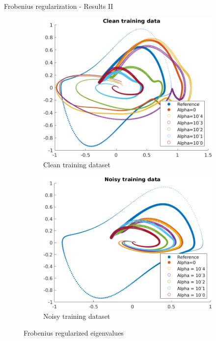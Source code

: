 \documentclass{beamer}
\begin{document}
\begin{frame}{Frobenius regularization - Results II}
    \begin{figure}
        \centering
        \begin{subfigure}[b]{0.45\textwidth}
            \centering
            \includegraphics[width=\textwidth]{Clean_Training.png}
            \caption{Clean training dataset}
            \label{fig:Eigen_clean}
        \end{subfigure}
        \hfill
        \begin{subfigure}[b]{0.45\textwidth}
            \centering
            \includegraphics[width=\textwidth]{Noisy_Training.png}
            \caption{Noisy training dataset}
            \label{fig:Eigen_noisy}
        \end{subfigure}
        \caption{Frobenius regularized eigenvalues}
        \label{fig:Eigen_Frobenius}
    \end{figure}
\end{frame}
\end{document}
